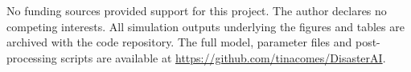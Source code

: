 \documentclass[pdflatex,sn-basic]{sn-jnl}
\begin{document}
 No funding sources provided support for this project.
 The author declares no competing interests.
 All simulation outputs underlying the figures and tables are archived with the code repository.
 The full model, parameter files and post-processing scripts are available at \url{https://github.com/tinacomes/DisasterAI}.


\end{document}
